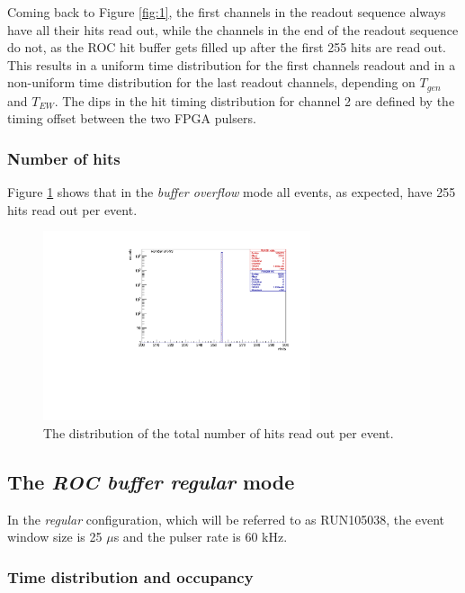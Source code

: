 Coming back to Figure \ref{fig:1}, the first channels in the readout sequence
always have all their hits read out,
while the channels in the end of the readout sequence do not,
as the ROC hit buffer gets filled up after
the first 255 hits are read out.
This results in a uniform time distribution for the first channels readout and in a non-uniform
time distribution for the last readout channels, depending on $T_{gen}$ and $T_{EW}$.
The dips in the hit timing distribution for channel 2 are defined by the timing offset
between the two FPGA pulsers. 


\subsubsection{Number of hits}
Figure \ref{fig:3} shows that in the \textit{buffer overflow} mode all events,
as expected, have 255 hits read out per event.

\begin{figure}[!h]
\centering
\includegraphics[width =0.7\textwidth]{figures/pdf/figure_00008_nhits_281.pdf}
\caption{
  The distribution of the total number of hits read out per event.
}
\label{fig:3}
\end{figure}
\subsection{The \textit{ROC buffer regular} mode }
In the \textit{regular} configuration, which will be referred to as RUN105038, the event window size is 25 $\mu$s
and the pulser rate is 60 kHz.

\subsubsection{Time distribution and occupancy}

